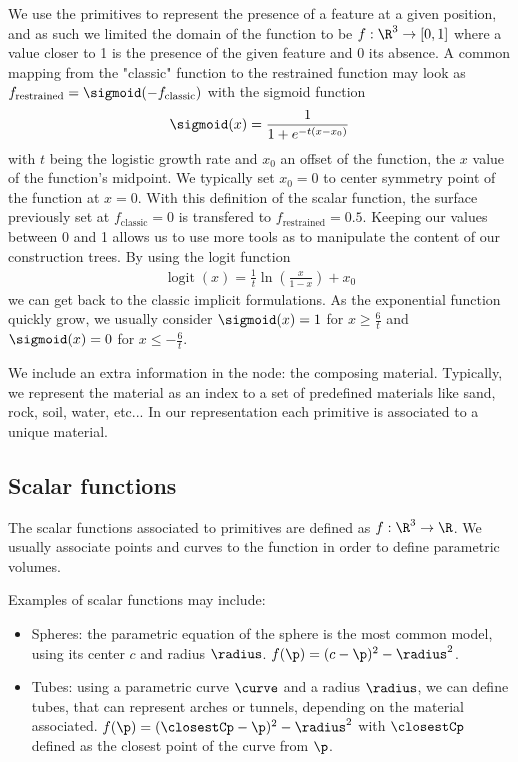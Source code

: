 We use the primitives to represent the presence of a feature at a given position, and as such we limited the domain of the function to be $f: \R^3 \to [0, 1]$ where a value closer to 1 is the presence of the given feature and 0 its absence. A common mapping from the "classic" function to the restrained function may look as $f_{\text{restrained}} = \sigmoid (- f_{\text{classic}})$ with the sigmoid function 
\begin{align}
    \sigmoid(x) = \frac{1}{1+e^{-t(x - x_0)}}
\end{align}    
with $t$ being the logistic growth rate and $x_0$ an offset of the function, the $x$ value of the function's midpoint. We typically set $x_0 = 0$ to center symmetry point of the function at $x = 0$. With this definition of the scalar function, the surface previously set at $f_{\text{classic}} = 0$ is transfered to $f_{\text{restrained}} = 0.5$. Keeping our values between 0 and 1 allows us to use more tools as to manipulate the content of our construction trees. By using the logit function 
\begin{align}
    \operatorname{logit}(x)=\frac{1}{t}\ln\left(\frac{x}{1-x}\right)+x_0
\end{align}
we can get back to the classic implicit formulations. As the exponential function quickly grow, we usually consider $\sigmoid(x)=1$ for $x \geq \frac{6}{t}$ and $\sigmoid(x)=0$ for $x \leq -\frac{6}{t}$.

We include an extra information in the node: the composing material. Typically, we represent the material as an index to a set of predefined materials like sand, rock, soil, water, etc... In our representation each primitive is associated to a unique material. 

\subsection{Scalar functions}
The scalar functions associated to primitives are defined as $f: \R^3 \to \R$. We usually associate points and curves to the function in order to define parametric volumes.

Examples of scalar functions may include:
\begin{itemize}
    \item Spheres: the parametric equation of the sphere is the most common model, using its center $c$ and radius $\radius$. $f(\p) = (c - \p)^2 - \radius^2$.
    \item Tubes: using a parametric curve $\curve$ and a radius $\radius$, we can define tubes, that can represent arches or tunnels, depending on the material associated. $f(\p) = (\closestCp - \p)^2 - \radius^2$ with $\closestCp$ defined as the closest point of the curve from $\p$.
\end{itemize}


